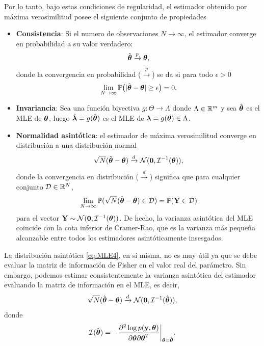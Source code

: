 Por lo tanto, bajo estas condiciones de regularidad, el estimador obtenido por máxima verosimilitud posee el siguiente conjunto de propiedades
\begin{itemize}
	\item \textbf{Consistencia}: Si el numero de observaciones $N\to\infty$, el estimador converge en probabilidad a su valor verdadero:
	\begin{equation}
		\hat{\boldsymbol{\theta}}\xrightarrow{p}\boldsymbol{\theta},
		\label{eq:MLE4.1}
	\end{equation}
	donde la convergencia en probabilidad ($\xrightarrow{p}$) se da si para todo $\epsilon >0$
	\[\lim\limits_{N\to \infty}\mathbb{P} \big(|\hat{\boldsymbol{\theta}}-\boldsymbol{\theta}|\ge\epsilon\big) = 0.\]
	\item \textbf{Invariancia}: Sea una función biyectiva $g:\Theta\to\Lambda$ donde $\Lambda\in\mathbb{R}^m$ y sea $\hat{\boldsymbol{\theta}}$ es el MLE de $\boldsymbol{\theta}$, luego $\hat{\boldsymbol{\lambda}}=g(\hat{\boldsymbol{\theta}})$ es el MLE de $\boldsymbol{\lambda}=g(\boldsymbol{\theta})\in\Lambda$.
	\item \textbf{Normalidad asintótica}: el estimador de máxima verosimilitud converge en distribución a una distribución normal
	\begin{equation}
		\sqrt{N}(\hat{\boldsymbol{\theta}}-\boldsymbol{\theta})\xrightarrow{d}\mathcal{N}(\mathbf{0},\mathcal{I}^{-1}(\boldsymbol{\theta})),
		\label{eq:MLE4}
	\end{equation}
	donde la convergencia en distribución ($\xrightarrow{d}$) significa que para cualquier conjunto $\mathcal{D}\in\mathbb{R}^N$,
	\[\lim\limits_{N\to\infty}\mathbb{P}(\sqrt{N}(\hat{\boldsymbol{\theta}}-\boldsymbol{\theta})\in\mathcal{D}) = \mathbb{P}(\mathbf{Y}\in\mathcal{D})\]
	para el vector $\mathbf{Y}\sim\mathcal{N}(\mathbf{0},\mathcal{I}^{-1}(\boldsymbol{\theta}))$. De hecho, la varianza asintótica del MLE coincide con la cota inferior de Cramer-Rao, que es la varianza más pequeña alcanzable entre todos los estimadores asintóticamente insesgados. 
\end{itemize}

La distribución asintótica \eqref{eq:MLE4}, en sí misma, no es muy útil ya que se debe evaluar la matriz de información de Fisher en el valor real del parámetro. Sin embargo, podemos estimar consistentemente la varianza asintótica del estimador evaluando la matriz de información en el MLE, es decir,
	\begin{equation}
\sqrt{N}(\hat{\boldsymbol{\theta}}-\boldsymbol{\theta})\xrightarrow{d}\mathcal{N}(\mathbf{0},\mathcal{I}^{-1}(\hat{\boldsymbol{\theta}})),
\label{eq:MLE5}
\end{equation}
donde 
\begin{equation}
\mathcal{I}(\hat{\boldsymbol{\theta}}) = -\frac{\partial^2\log p(\mathbf{y},\boldsymbol{\theta})}{\partial\boldsymbol{\theta}\partial\boldsymbol{\theta}^T}\bigg|_{\boldsymbol{\theta}=\hat{\boldsymbol{\theta}}}.
\label{eq:MLE6}
\end{equation}

